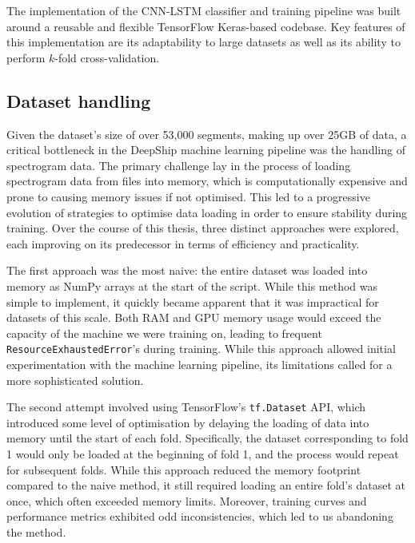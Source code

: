 The implementation of the CNN-LSTM classifier and training pipeline was built around a reusable and flexible TensorFlow Keras-based codebase. Key features of this implementation are its adaptability to large datasets as well as its ability to perform $k$-fold cross-validation. 

\subsection{Dataset handling}

Given the dataset's size of over 53,000 segments, making up over 25GB of data, a critical bottleneck in the DeepShip machine learning pipeline was the handling of spectrogram data. The primary challenge lay in the process of loading spectrogram data from files into memory, which is computationally expensive and prone to causing memory issues if not optimised. This led to a progressive evolution of strategies to optimise data loading in order to ensure stability during training. Over the course of this thesis, three distinct approaches were explored, each improving on its predecessor in terms of efficiency and practicality.

The first approach was the most naive: the entire dataset was loaded into memory as NumPy arrays at the start of the script. While this method was simple to implement, it quickly became apparent that it was impractical for datasets of this scale. Both RAM and GPU memory usage would exceed the capacity of the machine we were training on, leading to frequent \texttt{ResourceExhaustedError}'s during training. While this approach allowed initial experimentation with the machine learning pipeline, its limitations called for a more sophisticated solution.

The second attempt involved using TensorFlow's \texttt{tf.Dataset} API, which introduced some level of optimisation by delaying the loading of data into memory until the start of each fold. Specifically, the dataset corresponding to fold 1 would only be loaded at the beginning of fold 1, and the process would repeat for subsequent folds. While this approach reduced the memory footprint compared to the naive method, it still required loading an entire fold's dataset at once, which often exceeded memory limits. Moreover, training curves and performance metrics exhibited odd inconsistencies, which led to us abandoning the method.

